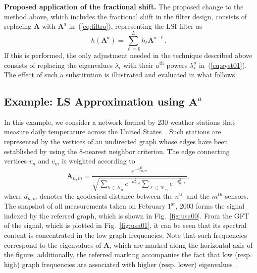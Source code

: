 \noindent\textbf{Proposed application of the fractional shift.} The proposed change to the method above, which includes the fractional shift in the filter design, consists of replacing $\mathbf{A}$ with $\mathbf{A}^a$ in~(\ref{eq:filtro}), representing the LSI filter as
\begin{equation}
    \label{eq:filtrofracnew}
    h(\mathbf{A}^a) = \sum_{\ell=0}^{L} h_\ell \mathbf{A}^{a \cdot \ell}.
\end{equation}
If this is performed, the only adjustment needed in the technique described above consists of replacing the eigenvalues $\lambda_i$ with their $a^{\text{th}}$ powers $\lambda_i^a$ in~(\ref{eq:syst01}). The effect of such a substitution is illustrated and evaluated in what follows.

\subsection{Example: LS Approximation using $\mathbf{A}^{{a}}$}\label{subsec:lsi01}
In this example, we consider a network formed by $230$ weather stations that measure daily temperature across the United States~\cite{data2011}. Such stations are represented by the vertices of an undirected graph whose edges have been established by using the $8$-nearest neighbor criterion.  The edge connecting vertices $v_n$ and $v_m$ is weighted according to
\begin{equation}
    \mathbf{A}_{n,m}=\frac{e^{-d^2_{n,m}}}{\sqrt{\sum_{k\in\mathcal{N}_n}e^{-d^2_{n,k}}\sum_{\ell\in\mathcal{N}_m}e^{-d^2_{n,\ell}}}},
\end{equation}
where $d_{n,m}$ denotes the geodesical distance between the $n^{\text{th}}$ and the $m^{\text{th}}$ sensors. The snapshot of all measurements taken on February $1^{\text{st}}$, 2003 forms the signal indexed by the referred graph, which is shown in Fig.~\ref{fig:usa00}. From the GFT of the signal, which is plotted in Fig.~\ref{fig:usa01}, it can be seen that its spectral content is concentrated in the low graph frequencies. Note that such frequencies correspond to the eigenvalues of $\mathbf{A}$, which are marked along the horizontal axis of the figure; additionally, the referred marking accompanies the fact that low (resp. high) graph frequencies are associated with higher (resp. lower) eigenvalues~\cite{sandryhaila2014frequency}.

